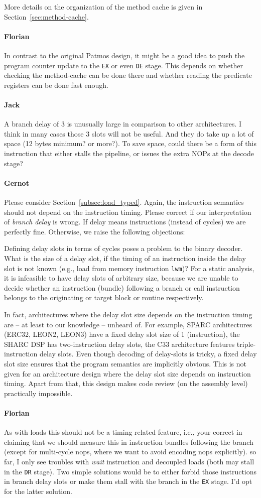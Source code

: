 \documentclass{IEEEtran}
\newcommand{\comment}[3]{\paragraph*{\textbf{#1}}{\color{#3}#2}}
\newcommand{\gebhard}[1]{\comment{Gernot}{#1}{RedOrange}}
\newcommand{\fb}[1]{\comment{Florian}{#1}{Emerald}}
\newcommand{\jack}[1]{\comment{Jack}{#1}{Magenta}}
\begin{document}
More details on the organization of the method cache is given in
Section~\ref{sec:method-cache}.

\fb{In contrast to the original Patmos design, it might be a good idea to push
    the program counter update to the \texttt{EX} or even \texttt{DE} stage.
    This depends on whether checking the method-cache can be done there and
    whether reading the predicate registers can be done fast enough.}

\jack{A branch delay of $3$ is unusually large in comparison to
    other architectures. I think in many cases
    those $3$ slots will not be useful. And they do take up a lot of
    space (12 bytes minimum? or more?). To save space, could there be a form
    of this instruction that either stalls the pipeline, or issues the
    extra NOPs at the decode stage?}

\gebhard{Please consider Section~\ref{subsec:load_typed}.
Again, the instruction semantics should not depend on the instruction timing.
Please correct if our interpretation of \emph{branch delay} is wrong.
If delay means instructions (instead of cycles) we are perfectly fine.
Otherwise, we raise the following objections:

Defining delay slots in terms of cycles poses a problem to the binary decoder.
What is the size of a delay slot, if the timing of an instruction inside the delay slot is not known (e.g., load from memory instruction \texttt{lwm})?
For a static analysis, it is infeasible to have delay slots of arbitrary size, because we are unable to decide whether an instruction (bundle) following a branch or call instruction belongs to the originating or target block or routine respectively.

In fact, architectures where the delay slot size depends on the instruction timing are -- at least to our knowledge -- unheard of.
For example, SPARC architectures (ERC32, LEON2, LEON3) have a fixed delay slot size of 1 (instruction), the SHARC DSP has two-instruction delay slots, the C33 architecture features triple-instruction delay slots.
Even though decoding of delay-slots is tricky, a fixed delay slot size ensures that the program semantics are implicitly obvious.
This is not given for an architecture design where the delay slot size depends on instruction timing.
Apart from that, this design makes code review (on the assembly level) practically impossible.}

\fb{As with loads this should not be a timing related feature, i.e., your
correct in claiming that we should measure this in instruction bundles following
the branch (except for multi-cycle nops, where we want to avoid encoding nops
explicitly). so far, I only see troubles with \emph{wait} instruction and
decoupled loads (both may stall in the \texttt{DR} stage). Two simple solutions
would be to either forbid those instructions in branch delay slots or make them
stall with the branch in the \texttt{EX} stage. I'd opt for the latter solution.
}
\end{document}
